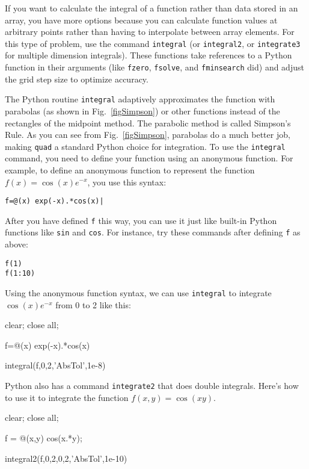 If you want to calculate the integral of a function rather than data stored
in an array, you have more options because you can calculate function values
at arbitrary points rather than having to interpolate between array elements.
For this type of problem, use the command {\tt integral} (or {\tt integral2},
or {\tt integrate3} for multiple dimension integrals).  These functions take
references to a Python function in their arguments (like {\tt fzero},
\texttt{fsolve}, and \texttt{fminsearch} did) and adjust the grid step size
to optimize accuracy.

The Python routine {\tt integral} adaptively approximates the function with
parabolas (as shown in Fig.~\ref{figSimpson}) or other functions instead of
the rectangles of the midpoint method. The parabolic method is called
Simpson's Rule. As you can see from Fig.~\ref{figSimpson}, parabolas do a
much better job, making {\tt quad} a standard Python choice for integration.
To use the {\tt integral} command, you need to define your function using an
anonymous function.  For example, to
define an anonymous function to represent the function $f(x) = \cos(x)
e^{-x}$, you use this syntax:
\begin{Verbatim}
f=@(x) exp(-x).*cos(x)|
\end{Verbatim}
After you have defined {\tt f} this way, you can use it just like built-in
Python functions like {\tt sin} and {\tt cos}.  For instance, try these
commands after defining {\tt f} as above:
\begin{Verbatim}
f(1)
f(1:10)
\end{Verbatim}
Using the anonymous function syntax, we can use {\tt integral} to integrate
$\cos(x) e^{-x}$ from 0 to 2 like this:



\begin{codeexample}
\begin{VerbatimOut}{\listingFile}
clear; close all;

f=@(x) exp(-x).*cos(x)

integral(f,0,2,'AbsTol',1e-8)
\end{VerbatimOut}
\end{codeexample}

Python also has a command {\tt integrate2} that does double integrals. Here's
how to use it to integrate the function $f(x,y) = \cos (xy)$.

\begin{codeexample}[f2int.py]
\begin{VerbatimOut}{\listingFile}
clear; close all;

f = @(x,y) cos(x.*y);

integral2(f,0,2,0,2,'AbsTol',1e-10)
\end{VerbatimOut}
\end{codeexample}
